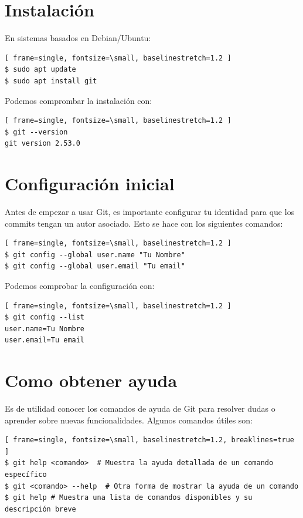 \documentclass[a4paper,12pt]{report}
\begin{document}
\section{Instalación}

En sistemas basados en Debian/Ubuntu:

\begin{Verbatim}[ frame=single, fontsize=\small, baselinestretch=1.2 ]
$ sudo apt update
$ sudo apt install git
\end{Verbatim}

Podemos comprombar la instalación con:
\begin{Verbatim}[ frame=single, fontsize=\small, baselinestretch=1.2 ]
$ git --version
git version 2.53.0
\end{Verbatim}

\section{Configuración inicial}

Antes de empezar a usar Git, es importante configurar tu identidad para que los commits tengan un autor asociado. Esto se hace con los siguientes comandos:
\begin{Verbatim}[ frame=single, fontsize=\small, baselinestretch=1.2 ]
$ git config --global user.name "Tu Nombre"
$ git config --global user.email "Tu email"
\end{Verbatim}

Podemos comprobar la configuración con:
\begin{Verbatim}[ frame=single, fontsize=\small, baselinestretch=1.2 ]
$ git config --list
user.name=Tu Nombre
user.email=Tu email
\end{Verbatim}

\section{Como obtener ayuda}
Es de utilidad conocer los comandos de ayuda de Git para resolver dudas o aprender sobre nuevas funcionalidades. Algunos comandos útiles son:
\begin{Verbatim}[ frame=single, fontsize=\small, baselinestretch=1.2, breaklines=true ]
$ git help <comando>  # Muestra la ayuda detallada de un comando específico
$ git <comando> --help  # Otra forma de mostrar la ayuda de un comando
$ git help # Muestra una lista de comandos disponibles y su descripción breve 
\end{Verbatim}
\end{document}

